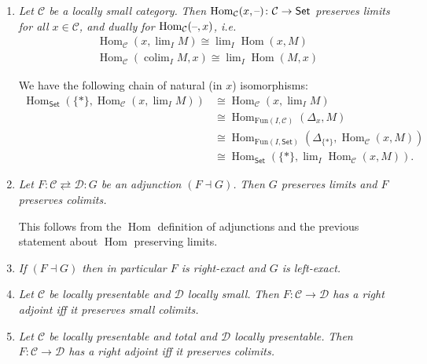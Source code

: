 \documentclass[10pt]{article}
\newcommand{\Set}{\mathsf{Set}}
\newcommand{\ccat}{\mathcal{C}}
\newcommand{\dcat}{\mathcal{D}}
\newcommand{\Fun}{\mathrm{Fun}}
\newcommand{\blank}{\hbox{--}}
\DeclareMathOperator{\Hom}{Hom}
\DeclareMathOperator*{\colim}{colim}
\begin{document}
            \begin{enumerate}
                \item \emph{Let $\ccat$ be a locally small category.}
                    \emph{Then $\Hom_\ccat(x,\blank)\colon\ccat\to\Set$ preserves limits for all $x\in\ccat$, and dually for $\Hom_\ccat(\blank,x)$, i.e.}
                    \begin{align*}
                        \Hom_\ccat(x,\lim\nolimits_I M)\cong\lim\nolimits_I\Hom(x,M)\\
                        \Hom_\ccat(\colim\nolimits_I M,x)\cong\lim\nolimits_I\Hom(M,x)
                    \end{align*}

                        We have the following chain of natural (in $x$) isomorphisms:
                        \begin{align*}
                            \Hom_\Set(\{*\},\Hom_\ccat(x,\lim\nolimits_I M)) &\cong \Hom_\ccat(x,\lim\nolimits_I M)\\
                            &\cong \Hom_{\Fun(I,\ccat)}(\Delta_x,M)\\
                            &\cong \Hom_{\Fun(I,\Set)}(\Delta_{\{*\}},\Hom_\ccat(x,M))\\
                            &\cong \Hom_\Set(\{*\},\lim\nolimits_I\Hom_\ccat(x,M)).
                        \end{align*}
                \item \emph{Let $F\colon\ccat\rightleftarrows\dcat\colon G$ be an adjunction $(F\dashv G)$.}
                    \emph{Then $G$ preserves \emph{limits} and $F$ preserves \emph{colimits}.}

                    This follows from the $\Hom$ definition of adjunctions and the previous statement about $\Hom$ preserving limits.
                \item \emph{If $(F\dashv G)$ then in particular $F$ is right-exact and $G$ is left-exact.}
                \item \emph{Let $\ccat$ be locally presentable and $\dcat$ locally small.}
                    \emph{Then $F\colon\ccat\to\dcat$ has a right adjoint iff it preserves small colimits.}

                \item \emph{Let $\ccat$ be locally presentable and total and $\dcat$ locally presentable.}
                    \emph{Then $F\colon\ccat\to\dcat$ has a right adjoint iff it preserves colimits.}

            \end{enumerate}
\end{document}
